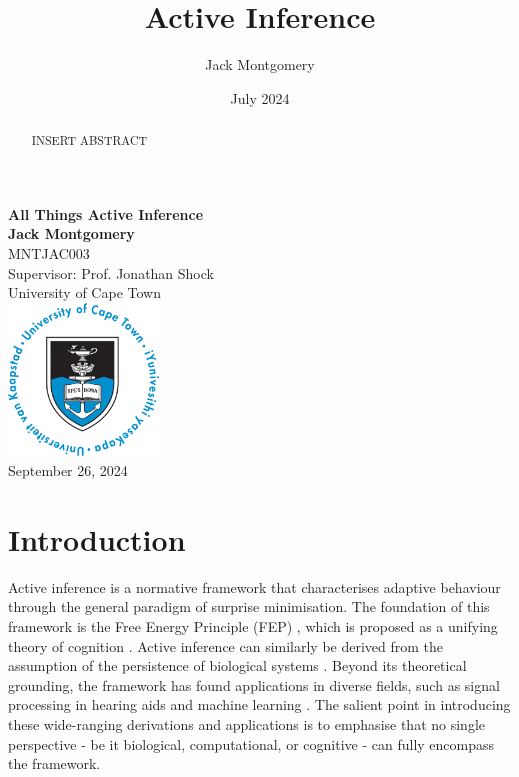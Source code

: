 \documentclass{article}
\title{Active Inference}
\author{Jack Montgomery}
\date{July 2024}
\begin{document}
\begin{titlepage}
    \centering
    \vspace*{1in}
    
    {\LARGE \textbf{All Things Active Inference}}\\[2cm]
    
    {\large \textbf{Jack Montgomery}}\\[0.5cm]
    {\large MNTJAC003}\\[0.5cm]
    {\large Supervisor: Prof. Jonathan Shock}\\
    {\large University of Cape Town}\\[2cm]
    
    \includegraphics[width=0.3\textwidth]{images/UCT_logo_circular_blue_large.png}\\[2cm]
    
    {\large September 26, 2024}\\[3cm]
    
    \begin{abstract}
INSERT ABSTRACT
    \end{abstract}
    
\end{titlepage}

\newpage

\tableofcontents

\newpage

\section{Introduction}

Active inference is a normative framework that characterises adaptive behaviour through the general paradigm of surprise minimisation. The foundation of this framework is the Free Energy Principle (FEP) \citep{friston2006free}, which is proposed as a unifying theory of cognition \citep{friston2010free}. Active inference can similarly be derived from the assumption of the persistence of biological systems \citep{friston2012active}. Beyond its theoretical grounding, the framework has found applications in diverse fields, such as signal processing in hearing aids \citep{podusenko2022aida} and machine learning \citep{millidge2021applications}. The salient point in introducing these wide-ranging derivations and applications is to emphasise that no single perspective - be it biological, computational, or cognitive - can fully encompass the framework.
\end{document}
